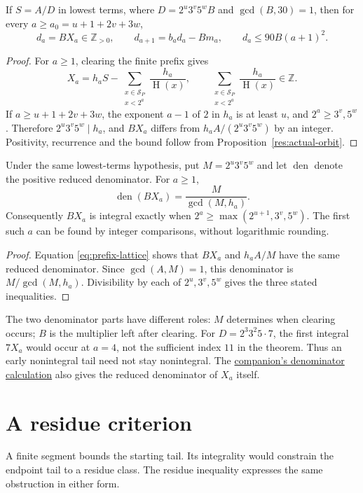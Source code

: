 \documentclass[11pt]{article}
\newcommand{\hgt}{\operatorname{H}}
\newcommand{\longrecord}[2]{\href{erdos269-running-lcm-reasoning-surface.pdf\##1}{#2}}
\begin{document}
\begin{theorem}
\label{res:denominator-reduction}
If $S=A/D$ in lowest terms, where
$D=2^u3^v5^wB$ and $\gcd(B,30)=1$, then for every
$a\ge a_0=u+1+2v+3w$,
\[
 d_a=BX_a\in\mathbb Z_{>0},\qquad
 d_{a+1}=b_ad_a-Bm_a,\qquad d_a\le90B(a+1)^2.
\]
\end{theorem}
\begin{proof}
For $a\ge1$, clearing the finite prefix gives
\begin{equation}\label{eq:prefix-lattice}
 X_a=h_aS-\sum_{\substack{x\in\mathcal S_P\\x<2^a}}
                 \frac{h_a}{\hgt(x)},\qquad
 \sum_{\substack{x\in\mathcal S_P\\x<2^a}}\frac{h_a}{\hgt(x)}\in\mathbb Z.
\end{equation}
If $a\ge u+1+2v+3w$, the exponent $a-1$ of $2$ in $h_a$ is at least $u$,
and $2^a\ge3^v,5^w$. Therefore $2^u3^v5^w\mid h_a$, and $BX_a$ differs
from $h_aA/(2^u3^v5^w)$ by an integer. Positivity, recurrence and the bound
follow from Proposition~\ref{res:actual-orbit}.
\end{proof}

\begin{corollary}\label{res:exact-onset}
Under the same lowest-terms hypothesis, put $M=2^u3^v5^w$ and let
$\operatorname{den}$ denote the positive reduced denominator.  For $a\ge1$,
\[
 \operatorname{den}(BX_a)=\frac{M}{\gcd(M,h_a)}.
\]
Consequently $BX_a$ is integral exactly when
$2^a\ge\max(2^{u+1},3^v,5^w)$.  The first such $a$ can be found by
integer comparisons, without logarithmic rounding.
\end{corollary}
\begin{proof}
Equation \eqref{eq:prefix-lattice} shows that $BX_a$ and $h_aA/M$ have
the same reduced denominator. Since $\gcd(A,M)=1$, this denominator is
$M/\gcd(M,h_a)$. Divisibility by each of $2^u,3^v,5^w$ gives the three
stated inequalities.
\end{proof}
The two denominator parts have different roles: $M$ determines when
clearing occurs; $B$ is the multiplier left after clearing. For
$D=2^3 3^2 5\cdot7$, the first integral $7X_a$ would occur at $a=4$,
not the sufficient index $11$ in the theorem. Thus an early nonintegral
tail need not stay nonintegral. The
\longrecord{r3-denominator}{companion's denominator calculation} also gives
the reduced denominator of $X_a$ itself.

\section{A residue criterion}\label{sec:escape}\label{sec:open}
A finite segment bounds the starting tail. Its integrality would
constrain the endpoint tail to a residue class. The residue inequality
expresses the same obstruction in either form.
\end{document}
